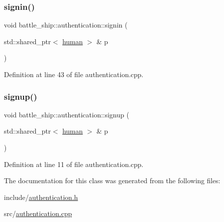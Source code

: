 \subsubsection{\texorpdfstring{signin()}{signin()}}
{\footnotesize\ttfamily void battle\+\_\+ship\+::authentication\+::signin (\begin{DoxyParamCaption}\item[{std\+::shared\+\_\+ptr$<$ \hyperlink{classbattle__ship_1_1human}{human} $>$ \&}]{p }\end{DoxyParamCaption})\hspace{0.3cm}{\ttfamily [static]}}



Definition at line 43 of file authentication.\+cpp.

\mbox{\label{classbattle__ship_1_1authentication_aeb0c243e25547624235a562f657cfd63}} 
\subsubsection{\texorpdfstring{signup()}{signup()}}
{\footnotesize\ttfamily void battle\+\_\+ship\+::authentication\+::signup (\begin{DoxyParamCaption}\item[{std\+::shared\+\_\+ptr$<$ \hyperlink{classbattle__ship_1_1human}{human} $>$ \&}]{p }\end{DoxyParamCaption})\hspace{0.3cm}{\ttfamily [static]}}



Definition at line 11 of file authentication.\+cpp.



The documentation for this class was generated from the following files\+:\begin{DoxyCompactItemize}
\item 
include/\hyperlink{authentication_8h}{authentication.\+h}\item 
src/\hyperlink{authentication_8cpp}{authentication.\+cpp}\end{DoxyCompactItemize}
